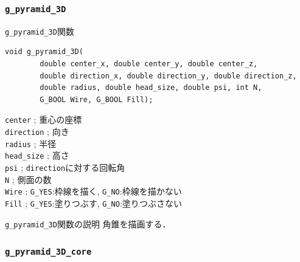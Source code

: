 \documentclass[platex,a4paper,12pt]{jsarticle}%
\begin{document}
\clearpage
\subsubsection{\texttt{g\_pyramid\_3D}}

\begin{itembox}[l]{\texttt{g\_pyramid\_3D}関数}
\begin{verbatim}
void g_pyramid_3D(
        double center_x, double center_y, double center_z,
        double direction_x, double direction_y, double direction_z,
        double radius, double head_size, double psi, int N,
        G_BOOL Wire, G_BOOL Fill);
\end{verbatim}
\verb|center| ; 重心の座標\\
\verb|direction| ; 向き\\
\verb|radius| ; 半径\\
\verb|head_size| ; 高さ\\
\verb|psi| ; \verb|direction|に対する回転角\\
\verb|N| ; 側面の数\\
\verb|Wire| ; \verb|G_YES|:枠線を描く, \verb|G_NO|:枠線を描かない \\
\verb|Fill| ; \verb|G_YES|:塗りつぶす, \verb|G_NO|:塗りつぶさない 
\end{itembox}

\begin{itembox}[l]{\texttt{g\_pyramid\_3D}関数の説明}
角錐を描画する．
\end{itembox}



\clearpage
\subsubsection{\texttt{g\_pyramid\_3D\_core}}
\end{document}
